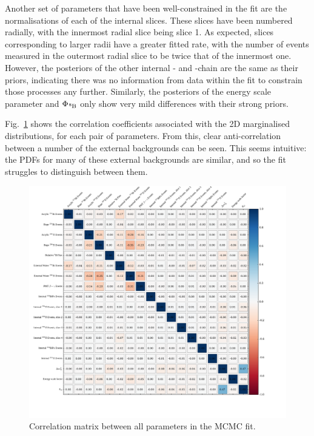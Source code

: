 Another set of parameters that have been well-constrained in the fit are the normalisations of each of the internal  slices. These slices have been numbered radially, with the innermost radial slice being slice 1. 
As expected, slices corresponding to larger radii have a greater fitted rate, with the number of events measured in the outermost radial slice to be twice that of the innermost one. However, the posteriors of the other internal - and -chain are the same as their priors, indicating there was no information from data within the fit to constrain those processes any further. Similarly, the posteriors of the energy scale parameter and $\Phi_{\beight{}}$ only show very mild differences with their strong priors.

Fig.~\ref{fig:corr_plots_params} shows the correlation coefficients associated with the 2D marginalised distributions, for each pair of parameters. From this, clear anti-correlation between a number of the external backgrounds can be seen. This seems intuitive: the PDFs for many of these external backgrounds are similar, and so the fit struggles to distinguish between them.

\begin{figure}[!th]
    \centering
    \includegraphics[width=\textwidth]{6_SolarAnalysis/images/corr_coeff2.pdf}
    \caption[Correlation matrix between all parameters in the MCMC fit]
    {Correlation matrix between all parameters in the MCMC fit.}
    \label{fig:corr_plots_params}
\end{figure}

